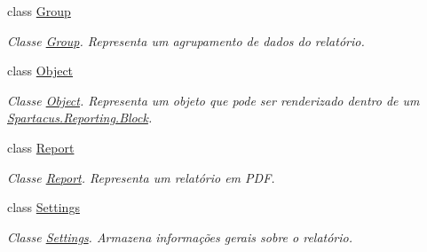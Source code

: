 \begin{DoxyCompactItemize}
class \hyperlink{classSpartacus_1_1Reporting_1_1Group}{Group}
\begin{DoxyCompactList}\small\item\em Classe \hyperlink{classSpartacus_1_1Reporting_1_1Group}{Group}. Representa um agrupamento de dados do relatório. \end{DoxyCompactList}\item 
class \hyperlink{classSpartacus_1_1Reporting_1_1Object}{Object}
\begin{DoxyCompactList}\small\item\em Classe \hyperlink{classSpartacus_1_1Reporting_1_1Object}{Object}. Representa um objeto que pode ser renderizado dentro de um \hyperlink{classSpartacus_1_1Reporting_1_1Block}{Spartacus.\+Reporting.\+Block}. \end{DoxyCompactList}\item 
class \hyperlink{classSpartacus_1_1Reporting_1_1Report}{Report}
\begin{DoxyCompactList}\small\item\em Classe \hyperlink{classSpartacus_1_1Reporting_1_1Report}{Report}. Representa um relatório em P\+D\+F. \end{DoxyCompactList}\item 
class \hyperlink{classSpartacus_1_1Reporting_1_1Settings}{Settings}
\begin{DoxyCompactList}\small\item\em Classe \hyperlink{classSpartacus_1_1Reporting_1_1Settings}{Settings}. Armazena informações gerais sobre o relatório. \end{DoxyCompactList}\end{DoxyCompactItemize}
